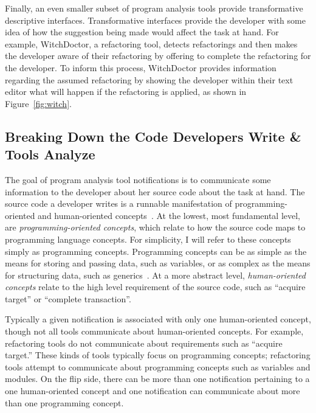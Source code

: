 Finally, an even smaller subset of program analysis tools provide transformative descriptive interfaces. Transformative interfaces provide the developer with some idea of how the suggestion being made would affect the task at hand. For example, WitchDoctor, a refactoring tool, detects refactorings and then makes the developer aware of their refactoring by offering to complete the refactoring for the developer. To inform this process, WitchDoctor provides information regarding the assumed refactoring by showing the developer within their text editor what will happen if the refactoring is applied, as shown in Figure~\ref{fig:witch}.



\subsection{Breaking Down the Code Developers Write \& Tools Analyze}

The goal of program analysis tool notifications is to communicate some information to the developer about her source code about the task at hand.
The source code a developer writes is a runnable manifestation of programming-oriented and human-oriented concepts~\cite{van2004concepts,biggerstaff1994program}. 
At the lowest, most fundamental level, are \emph{programming-oriented concepts}, which relate to how the source code maps to programming language concepts. For simplicity, I will refer to these concepts simply as programming concepts.
Programming concepts can be as simple as the means for storing and passing data, such as variables, or as complex as the means for structuring data, such as generics~\cite{jazayeri1997programming}.
At a more abstract level, \emph{human-oriented concepts} relate to the high level requirement of the source code, such as ``acquire target'' or ``complete transaction''.

Typically a given notification is associated with only one human-oriented concept, though not all tools communicate about human-oriented concepts. For example, refactoring tools do not communicate about requirements such as ``acquire target.'' These kinds of tools typically focus on programming concepts; refactoring tools attempt to communicate about programming concepts such as variables and modules.
On the flip side, there can be more than one notification pertaining to a one human-oriented concept and one notification can communicate about more than one programming concept. 

